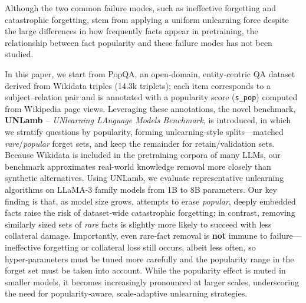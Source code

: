 Although the two common failure modes, such as ineffective forgetting and catastrophic forgetting, stem from applying a uniform unlearning force despite the large differences in how frequently facts appear in pretraining, the relationship between fact popularity and these failure modes has not been studied.



In this paper, we start from PopQA, an open‑domain, entity‑centric QA dataset derived from Wikidata triples (14.3k triplets); each item corresponds to a subject–relation pair and is annotated with a popularity score (\texttt{s\_pop}) computed from Wikipedia page views.  
Leveraging these annotations, the novel benchmark, \textbf{UNLamb} \textit{-- UNlearning LAnguage Models Benchmark}, is introduced, in which we stratify questions by popularity, forming unlearning-style splits—matched \emph{rare}/\emph{popular} forget sets, and keep the remainder for retain/validation sets.
Because Wikidata is included in the pretraining corpora of many LLMs, our benchmark approximates real-world knowledge removal more closely than synthetic alternatives. Using UNLamb, we evaluate representative unlearning algorithms on LLaMA-3 family models from 1B to 8B parameters.  
Our key finding is that, as model size grows, attempts to erase \emph{popular}, deeply embedded facts raise the risk of dataset‑wide catastrophic forgetting; in contrast, removing similarly sized sets of \emph{rare} facts is slightly more likely to succeed with less collateral damage.  
Importantly, even rare‑fact removal is \textbf{not} immune to failure—ineffective forgetting or collateral loss still occurs, albeit less often, so hyper‑parameters must be tuned more carefully and the popularity range in the forget set must be taken into account.  
While the popularity effect is muted in smaller models, it becomes increasingly pronounced at larger scales, underscoring the need for popularity‑aware, scale‑adaptive unlearning strategies.

